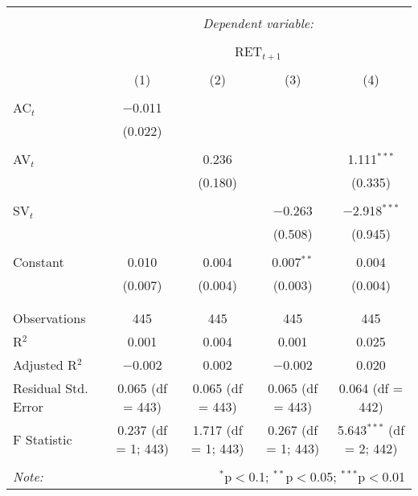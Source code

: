 
\begin{table}[!htbp] \centering 
  \caption{} 
  \label{} 
\begin{tabular}{@{\extracolsep{5pt}}lcccc} 
\\[-1.8ex]\hline 
\hline \\[-1.8ex] 
 & \multicolumn{4}{c}{\textit{Dependent variable:}} \\ 
\cline{2-5} 
\\[-1.8ex] & \multicolumn{4}{c}{RET$_{t+1}$} \\ 
\\[-1.8ex] & (1) & (2) & (3) & (4)\\ 
\hline \\[-1.8ex] 
 AC$_{t}$ & $-$0.011 &  &  &  \\ 
  & (0.022) &  &  &  \\ 
  & & & & \\ 
 AV$_{t}$ &  & 0.236 &  & 1.111$^{***}$ \\ 
  &  & (0.180) &  & (0.335) \\ 
  & & & & \\ 
 SV$_{t}$ &  &  & $-$0.263 & $-$2.918$^{***}$ \\ 
  &  &  & (0.508) & (0.945) \\ 
  & & & & \\ 
 Constant & 0.010 & 0.004 & 0.007$^{**}$ & 0.004 \\ 
  & (0.007) & (0.004) & (0.003) & (0.004) \\ 
  & & & & \\ 
\hline \\[-1.8ex] 
Observations & 445 & 445 & 445 & 445 \\ 
R$^{2}$ & 0.001 & 0.004 & 0.001 & 0.025 \\ 
Adjusted R$^{2}$ & $-$0.002 & 0.002 & $-$0.002 & 0.020 \\ 
Residual Std. Error & 0.065 (df = 443) & 0.065 (df = 443) & 0.065 (df = 443) & 0.064 (df = 442) \\ 
F Statistic & 0.237 (df = 1; 443) & 1.717 (df = 1; 443) & 0.267 (df = 1; 443) & 5.643$^{***}$ (df = 2; 442) \\ 
\hline 
\hline \\[-1.8ex] 
\textit{Note:}  & \multicolumn{4}{r}{$^{*}$p$<$0.1; $^{**}$p$<$0.05; $^{***}$p$<$0.01} \\ 
\end{tabular} 
\end{table} 
